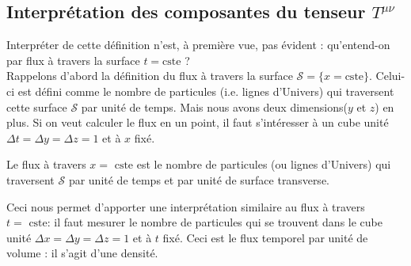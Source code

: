 \subsection{Interprétation des composantes du tenseur $T^{\mu\nu}$}
Interpréter de cette définition n'est, à première vue, pas évident : qu'entend-on par flux à travers la surface $t = \text{cste}$ ? \\
Rappelons d'abord la définition du flux à travers la surface $\mathcal{S}=\{x=\text{cste}\}$. Celui-ci est défini comme le nombre de particules (i.e. lignes d'Univers) qui traversent cette surface $\mathcal{S}$ par unité de temps. Mais nous avons deux dimensions($y$ et $z$) en plus. Si on veut calculer le flux en un point, il faut s'intéresser à un cube unité $\Delta t= \Delta y = \Delta z = 1$ et à $x$ fixé.
\begin{theoremframe}
    \begin{defi}
        Le flux à travers $x=\text{ cste}$ est le nombre de particules (ou lignes d'Univers) qui traversent $\mathcal{S}$ par unité de temps et par unité de surface transverse. 
    \end{defi}
\end{theoremframe}
Ceci nous permet d'apporter une interprétation similaire au flux à travers  $t=\text{ cste}$: il faut mesurer le nombre de particules qui se trouvent dans le cube unité $\Delta x= \Delta y = \Delta z = 1$ et à $t$ fixé. Ceci est le flux temporel par unité de volume : il s'agit d'une densité.

